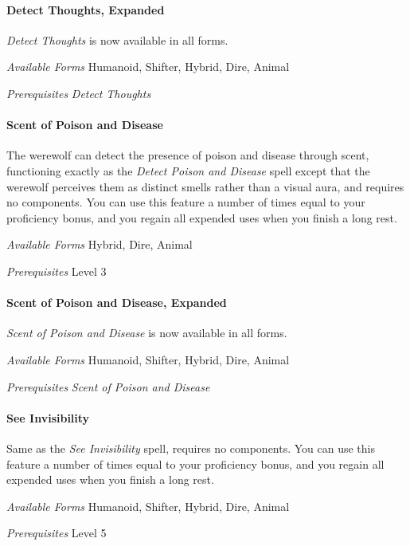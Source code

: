 \documentclass[twocolumn]{dndbook}
\begin{document}
\paragraph*{Detect Thoughts, Expanded}
\emph{Detect Thoughts} is now available in all forms.\par
\emph{Available Forms} Humanoid, Shifter, Hybrid, Dire, Animal\par
\emph{Prerequisites} \emph{Detect Thoughts}\par

\paragraph*{Scent of Poison and Disease}
The werewolf can detect the presence of poison and disease through scent, functioning exactly as the \emph{Detect Poison and Disease} spell except that the werewolf perceives them as distinct smells rather than a visual aura, and requires no components.
You can use this feature a number of times equal to your proficiency bonus, and you regain all expended uses when you finish a long rest.\par
\emph{Available Forms} Hybrid, Dire, Animal\par
\emph{Prerequisites} Level 3\par

\paragraph*{Scent of Poison and Disease, Expanded}
\emph{Scent of Poison and Disease} is now available in all forms.\par
\emph{Available Forms} Humanoid, Shifter, Hybrid, Dire, Animal\par
\emph{Prerequisites} \emph{Scent of Poison and Disease}\par

\paragraph*{See Invisibility}
Same as the \emph{See Invisibility} spell, requires no components.
You can use this feature a number of times equal to your proficiency bonus, and you regain all expended uses when you finish a long rest.\par
\emph{Available Forms} Humanoid, Shifter, Hybrid, Dire, Animal\par
\emph{Prerequisites} Level 5\par
\end{document}
